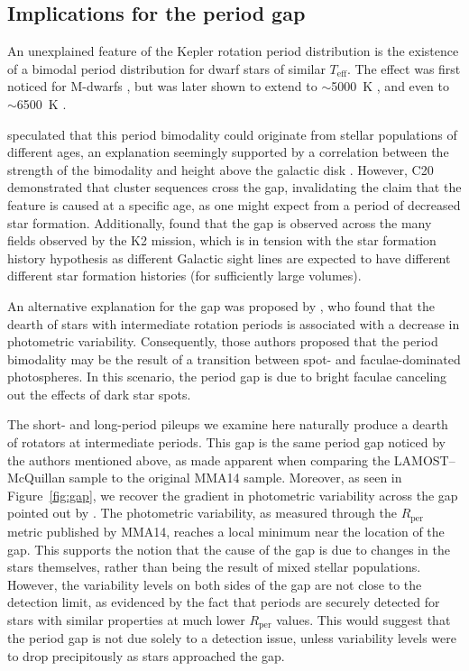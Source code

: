\documentclass[trackchanges,twocolumn]{aastex631}
\newcommand{\lamostmcq}{LAMOST--McQuillan\xspace}
\newcommand{\mma}{MMA14\xspace}
\newcommand{\curtis}{C20\xspace}
\newcommand{\teff}{\ensuremath{T_{\mathrm{eff}}}\xspace}
\newcommand{\rper}{\ensuremath{R_\mathrm{per}}\xspace}
\begin{document}
\subsection{Implications for the period gap} \label{subsec:gap}

An unexplained feature of the Kepler rotation period distribution is the existence of a bimodal period distribution for dwarf stars of similar \teff. The effect was first noticed for M-dwarfs \citep{McQuillan2013b}, but was later shown to extend to $\sim$5000~K \citep{Reinhold2013, McQuillan2014, ReinholdHekker2020}, and even to $\sim$6500~K \citep{Davenport2017}. 

\citet{McQuillan2013b, McQuillan2014} speculated that this period bimodality could originate from stellar populations of different ages, an explanation seemingly supported by a correlation between the strength of the bimodality and height above the galactic disk \citep{DavenportCovey2018}. However, \curtis demonstrated that cluster sequences cross the gap, invalidating the claim that the feature is caused at a specific age, as one might expect from a period of decreased star formation. Additionally, \citet{Gordon2021} found that the gap is observed across the many fields observed by the K2 mission, which is in tension with the star formation history hypothesis as different Galactic sight lines are expected to have different different star formation histories (for sufficiently large volumes). 

An alternative explanation for the gap was proposed by \citet{Reinhold2019}, who found that the dearth of stars with intermediate rotation periods is associated with a decrease in photometric variability. Consequently, those authors proposed that the period bimodality may be the result of a transition between spot- and faculae-dominated photospheres. In this scenario, the period gap is due to bright faculae canceling out the effects of dark star spots. 

The short- and long-period pileups we examine here naturally produce a dearth of rotators at intermediate periods. This gap is the same period gap noticed by the authors mentioned above, as made apparent when comparing the \lamostmcq sample to the original \mma sample. Moreover, as seen in Figure~\ref{fig:gap}, we recover the gradient in photometric variability across the gap pointed out by \citet{Reinhold2019}. The photometric variability, as measured through the \rper metric published by \mma, reaches a local minimum near the location of the gap. This supports the notion that the cause of the gap is due to changes in the stars themselves, rather than being the result of mixed stellar populations. However, the variability levels on both sides of the gap are not close to the detection limit, as evidenced by the fact that periods are securely detected for stars with similar properties at much lower \rper values. This would suggest that the period gap is not due solely to a detection issue, unless variability levels were to drop precipitously as stars approached the gap. 
\end{document}
